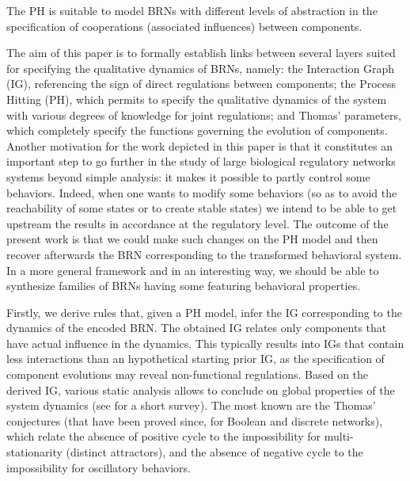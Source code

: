 The PH is suitable to model BRNs with different levels of abstraction in the specification of
cooperations (associated influences) between components.   

\medskip

The aim of this paper is to formally establish links between several layers suited for specifying the
qualitative dynamics of BRNs, namely:
the Interaction Graph (IG), referencing the sign of direct regulations between components;
the Process Hitting (PH), which permits to specify the qualitative dynamics of the system with
various degrees of knowledge for joint regulations;
and Thomas' parameters, which completely specify the functions governing the evolution of
components.
Another motivation for the work depicted in this paper is that it constitutes an important step
to go further in the study of large biological regulatory networks systems beyond simple analysis:
it makes it possible to partly control some behaviors.
Indeed, when one wants to modify some behaviors
(\eg so as to avoid the reachability of some states or to create stable states)
we intend to be able to get upstream the results in accordance at the regulatory level.
The outcome of the present work is that we could make such changes on the PH model
and then recover afterwards the BRN corresponding to the transformed behavioral system.
In a more general framework and in an interesting way,
we should be able to synthesize families of BRNs having some featuring behavioral properties.

Firstly, we derive rules that, given a PH model, infer the IG corresponding to the dynamics of the
encoded BRN.
The obtained IG relates only components that have actual influence in the dynamics.
This typically results into IGs that contain less interactions than an hypothetical starting prior
IG, as the specification of component evolutions may reveal non-functional regulations.
Based on the derived IG, various static analysis allows to conclude on global properties
of the system dynamics (see \cite{PR11-SASB} for a short survey).
The most known are the Thomas' conjectures (that have been proved since,
\eg \cite{RRT08,RiCo07,Richard2010378}
for Boolean and discrete networks),
which relate the absence of
positive cycle to the impossibility for multi-stationarity (distinct attractors),
and the absence of negative cycle to the impossibility for oscillatory behaviors.

